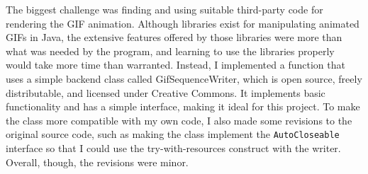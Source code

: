 \documentclass[10 pt]{scrartcl}
\begin{document}
The biggest challenge was finding and using suitable third-party code for rendering the GIF animation. Although libraries exist for manipulating animated GIFs in Java, the extensive features offered by those libraries were more than what was needed by the program, and learning to use the libraries properly would take more time than warranted. Instead, I implemented a function that uses a simple backend class called GifSequenceWriter, which is open source, freely distributable, and licensed under Creative Commons. It implements basic functionality and has a simple interface, making it ideal for this project. To make the class more compatible with my own code, I also made some revisions to the original source code, such as making the class implement the \verb|AutoCloseable| interface so that I could use the try-with-resources construct with the writer. Overall, though, the revisions were minor.

%
\end{document}
